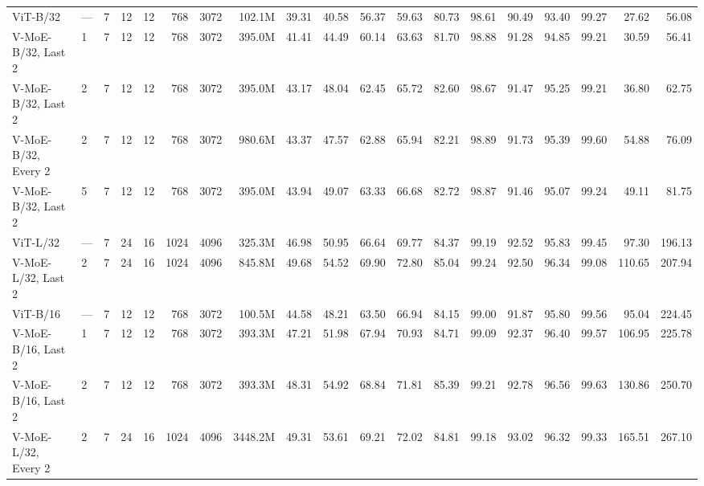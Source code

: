 \documentclass{article}
\begin{document}
\begin{landscape}
\begin{table}[H]
{{\begin{tabular}{llrrrrrrrrrrrrrrrrr}
            ViT-B/32 &  --- &       7 &      12 &     12 &     768 &  3072 &   102.1M &    39.31 &   40.58 &   56.37 &    59.63 &    80.73 &   98.61 &    90.49 &   93.40 &   99.27 &      27.62 &    56.08 \\
  V-MoE-B/32, Last 2 &    1 &       7 &      12 &     12 &     768 &  3072 &   395.0M &    41.41 &   44.49 &   60.14 &    63.63 &    81.70 &   98.88 &    91.28 &   94.85 &   99.21 &      30.59 &    56.41 \\
  V-MoE-B/32, Last 2 &    2 &       7 &      12 &     12 &     768 &  3072 &   395.0M &    43.17 &   48.04 &   62.45 &    65.72 &    82.60 &   98.67 &    91.47 &   95.25 &   99.21 &      36.80 &    62.75 \\
 V-MoE-B/32, Every 2 &    2 &       7 &      12 &     12 &     768 &  3072 &   980.6M &    43.37 &   47.57 &   62.88 &    65.94 &    82.21 &   98.89 &    91.73 &   95.39 &   99.60 &      54.88 &    76.09 \\
  V-MoE-B/32, Last 2 &    5 &       7 &      12 &     12 &     768 &  3072 &   395.0M &    43.94 &   49.07 &   63.33 &    66.68 &    82.72 &   98.87 &    91.46 &   95.07 &   99.24 &      49.11 &    81.75 \\
            ViT-L/32 &  --- &       7 &      24 &     16 &    1024 &  4096 &   325.3M &    46.98 &   50.95 &   66.64 &    69.77 &    84.37 &   99.19 &    92.52 &   95.83 &   99.45 &      97.30 &   196.13 \\
  V-MoE-L/32, Last 2 &    2 &       7 &      24 &     16 &    1024 &  4096 &   845.8M &    49.68 &   54.52 &   69.90 &    72.80 &    85.04 &   99.24 &    92.50 &   96.34 &   99.08 &     110.65 &   207.94 \\
            ViT-B/16 &  --- &       7 &      12 &     12 &     768 &  3072 &   100.5M &    44.58 &   48.21 &   63.50 &    66.94 &    84.15 &   99.00 &    91.87 &   95.80 &   99.56 &      95.04 &   224.45 \\
  V-MoE-B/16, Last 2 &    1 &       7 &      12 &     12 &     768 &  3072 &   393.3M &    47.21 &   51.98 &   67.94 &    70.93 &    84.71 &   99.09 &    92.37 &   96.40 &   99.57 &     106.95 &   225.78 \\
  V-MoE-B/16, Last 2 &    2 &       7 &      12 &     12 &     768 &  3072 &   393.3M &    48.31 &   54.92 &   68.84 &    71.81 &    85.39 &   99.21 &    92.78 &   96.56 &   99.63 &     130.86 &   250.70 \\
 V-MoE-L/32, Every 2 &    2 &       7 &      24 &     16 &    1024 &  4096 &  3448.2M &    49.31 &   53.61 &   69.21 &    72.02 &    84.81 &   99.18 &    93.02 &   96.32 &   99.33 &     165.51 &   267.10 \\

\end{tabular}}}
\end{table}
\end{landscape}
\end{document}

